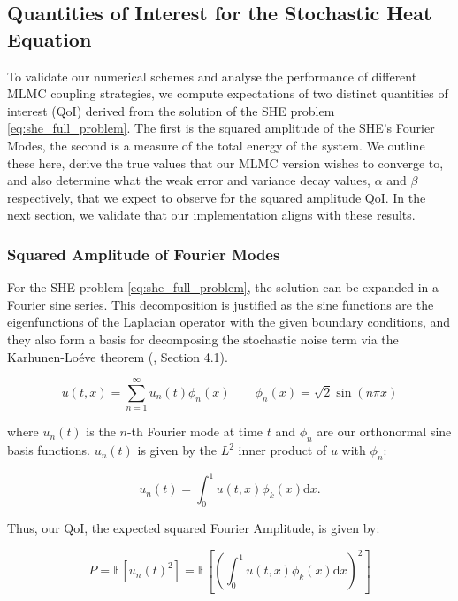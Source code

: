 \subsection{Quantities of Interest for the Stochastic Heat Equation}\label{sec:QoI_for_SHE}

To validate our numerical schemes and analyse the performance 
of different MLMC coupling strategies, we compute expectations
of two distinct quantities of interest (QoI) derived from the solution 
of the SHE problem \eqref{eq:she_full_problem}.
The first is the squared amplitude of the SHE's Fourier Modes,
the second is a measure of the total energy of the 
system. We outline these here, derive the true values that
our MLMC version wishes to converge to, and also 
determine what the weak error and variance decay values, $\alpha$ and 
$\beta$ respectively, that we expect to observe for the squared amplitude QoI.
In the next section,
we validate that our implementation aligns with these results. 

\subsubsection{Squared Amplitude of Fourier Modes}

For the SHE problem \eqref{eq:she_full_problem}, 
the solution can be expanded in a Fourier sine series. This 
decomposition is justified 
as the sine functions are the eigenfunctions of the Laplacian 
operator with the given boundary conditions, and they also form a basis 
for decomposing the stochastic noise term via the Karhunen-Loéve theorem
(\cite{da2014stochastic}, Section 4.1).

\begin{equation*}
    u(t,x) = \sum_{n=1}^\infty u_n(t)\phi_n(x) \qquad \phi_n(x) = \sqrt{2}\sin (n\pi x)
\end{equation*}

where $u_n(t)$ is the $n$-th Fourier mode at time $t$ and $\phi_n$ are our 
orthonormal sine basis functions. $u_n(t)$ is given by the $L^2$ 
inner product of $u$ with $\phi_n$:

\begin{equation*}
    u_n(t) = \int_0^1 u(t,x)\phi_k(x)\mathrm{d}x.
\end{equation*}

Thus, our QoI, the expected squared Fourier Amplitude, is given by:

\begin{equation*}
    P = \mathbb{E}\left[u_n(t)^2\right] = 
    \mathbb{E}\left[\left(\int_0^1 u(t,x)\phi_k(x)\mathrm{d}x\right)^2\right]
\end{equation*}

